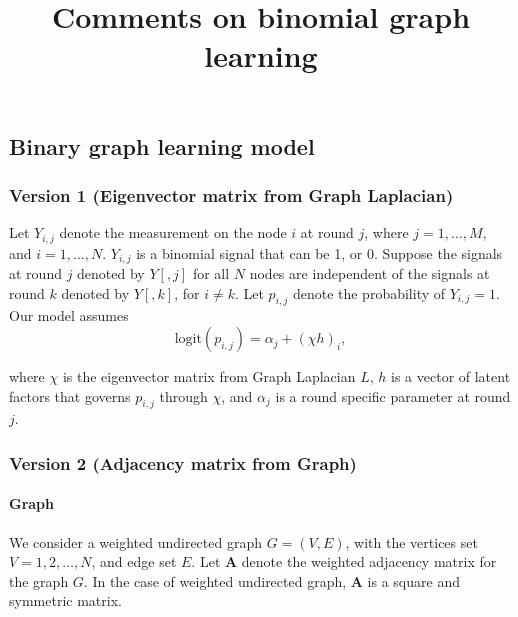 \documentclass[
]{article}
\title{Comments on binomial graph learning}
\author{}
\date{\vspace{-2.5em}}
\begin{document}
\maketitle

\hypertarget{binary-graph-learning-model}{%
\subsection{Binary graph learning
model}\label{binary-graph-learning-model}}

\hypertarget{version-1-eigenvector-matrix-from-graph-laplacian}{%
\subsubsection{Version 1 (Eigenvector matrix from Graph
Laplacian)}\label{version-1-eigenvector-matrix-from-graph-laplacian}}

Let \(Y_{i,j}\) denote the measurement on the node \(i\) at round \(j\),
where \(j = 1, \dots, M\), and \(i = 1, \dots, N\). \(Y_{i,j}\) is a
binomial signal that can be 1, or 0. Suppose the signals at round \(j\)
denoted by \(Y[, j]\) for all \(N\) nodes are independent of the signals
at round \(k\) denoted by \(Y[,k ]\), for \(i \neq k\). Let \(p_{i,j}\)
denote the probability of \(Y_{i,j} = 1\). Our model assumes
\[\text{logit}(p_{i,j}) = \alpha_j + (\chi h )_i,\]

where \(\chi\) is the eigenvector matrix from Graph Laplacian \(L\),
\(h\) is a vector of latent factors that governs \(p_{i, j}\) through
\(\chi\), and \(\alpha_j\) is a round specific parameter at round \(j\).

\hypertarget{version-2-adjacency-matrix-from-graph}{%
\subsubsection{Version 2 (Adjacency matrix from
Graph)}\label{version-2-adjacency-matrix-from-graph}}

\hypertarget{graph}{%
\paragraph{Graph}\label{graph}}

We consider a weighted undirected graph \(G = (V, E)\), with the
vertices set \(V = {1, 2, \dots, N}\), and edge set \(E\). Let
\(\mathbf{A}\) denote the weighted adjacency matrix for the graph \(G\).
In the case of weighted undirected graph, \(\mathbf{A}\) is a square and
symmetric matrix.
\end{document}
